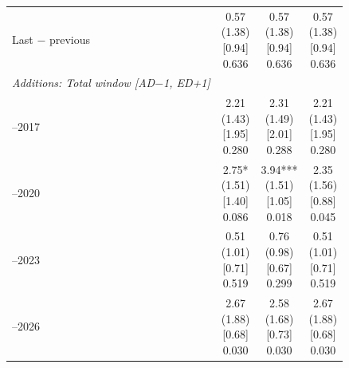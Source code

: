 \begin{threeparttable}
\begin{tabular}{@{}lccc}
\addlinespace[0.25ex]
\addlinespace[0.25ex]
Last $-$ previous & \makecell{0.57\\(1.38)\\{}[0.94]\\{0.636}} & \makecell{0.57\\(1.38)\\{}[0.94]\\{0.636}} & \makecell{0.57\\(1.38)\\{}[0.94]\\{0.636}} \\
\addlinespace[0.25ex]
\midrule
\emph{Additions: Total window [AD$-$1, ED+1]} \\
\addlinespace[0.25ex]
\addlinespace[1ex]
2013–2017 & \makecell{2.21\\(1.43)\\{}[1.95]\\{0.280}} & \makecell{2.31\\(1.49)\\{}[2.01]\\{0.288}} & \makecell{2.21\\(1.43)\\{}[1.95]\\{0.280}} \\
\addlinespace[0.25ex]
\addlinespace[0.25ex]
2018–2020 & \makecell{2.75*\\(1.51)\\{}[1.40]\\{0.086}} & \makecell{3.94***\\(1.51)\\{}[1.05]\\{0.018}} & \makecell{2.35\\(1.56)\\{}[0.88]\\{0.045}} \\
\addlinespace[0.25ex]
\addlinespace[0.25ex]
2021–2023 & \makecell{0.51\\(1.01)\\{}[0.71]\\{0.519}} & \makecell{0.76\\(0.98)\\{}[0.67]\\{0.299}} & \makecell{0.51\\(1.01)\\{}[0.71]\\{0.519}} \\
\addlinespace[0.25ex]
\addlinespace[0.25ex]
2024–2026 & \makecell{2.67\\(1.88)\\{}[0.68]\\{0.030}} & \makecell{2.58\\(1.68)\\{}[0.73]\\{0.030}} & \makecell{2.67\\(1.88)\\{}[0.68]\\{0.030}} \\

\end{tabular}
\end{threeparttable}
